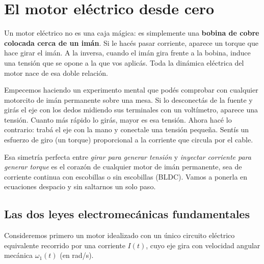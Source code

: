 \documentclass[11pt,a4paper,oneside]{book}
\begin{document}
\tableofcontents

\mainmatter

\chapter{El motor eléctrico desde cero}\label{cap:motor}

\begin{ideafisica}
Un motor eléctrico no es una caja mágica: es simplemente una \textbf{bobina de
cobre colocada cerca de un imán}. Si le hacés pasar corriente, aparece un torque
que hace girar el imán. A la inversa, cuando el imán gira frente a la bobina,
induce una tensión que se opone a la que vos aplicás. Toda la dinámica eléctrica
del motor nace de esa doble relación.
\end{ideafisica}

Empecemos haciendo un experimento mental que podés comprobar con cualquier
motorcito de imán permanente sobre una mesa. Si lo desconectás de la fuente y
girás el eje con los dedos midiendo sus terminales con un voltímetro, aparece
una tensión. Cuanto más rápido lo girás, mayor es esa tensión. Ahora hacé lo
contrario: trabá el eje con la mano y conectale una tensión pequeña. Sentís un
esfuerzo de giro (un torque) proporcional a la corriente que circula por el
cable.

Esa simetría perfecta entre \emph{girar para generar tensión} y \emph{inyectar
corriente para generar torque} es el corazón de cualquier motor de imán
permanente, sea de corriente continua con escobillas o sin escobillas (BLDC).
Vamos a ponerla en ecuaciones despacio y sin saltarnos un solo paso.

\section{Las dos leyes electromecánicas fundamentales}

Consideremos primero un motor idealizado con un único circuito eléctrico
equivalente recorrido por una corriente $I(t)$, cuyo eje gira con velocidad
angular mecánica $\omega_1(t)$ (en \si{rad/s}).
\end{document}
